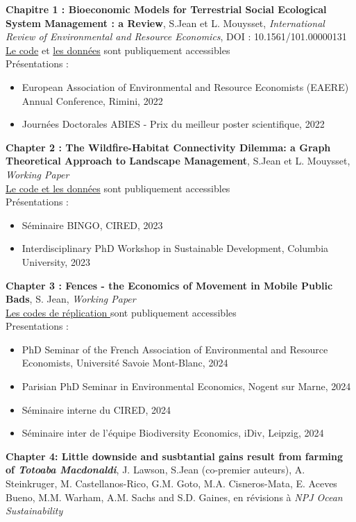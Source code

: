 \textbf{Chapitre 1 :  Bioeconomic Models for Terrestrial Social Ecological System Management : a Review}, S.Jean et L. Mouysset, \textit{International Review of Environmental and Resource Economics},
 DOI : 10.1561/101.00000131\\
\href{https://github.com/sim-jean/review-irere}{Le code} et \href{https://zenodo.org/records/6656433}{les données} sont publiquement accessibles
\\
 Présentations : 
\begin{itemize}
\item European Association of Environmental and Resource Economists (EAERE) Annual Conference, Rimini, 2022
\item Journées Doctorales ABIES - Prix du meilleur poster scientifique, 2022
\end{itemize}
%
\textbf{Chapter 2 : The Wildfire-Habitat Connectivity Dilemma: a Graph Theoretical Approach to Landscape Management}, S.Jean et L. Mouysset, \textit{Working Paper}\\
\href{https://github.com/sim-jean/Landscape_connectivity_dilemma}{Le code et les données} sont publiquement accessibles
%
\\
Présentations : 
\begin{itemize}
\item Séminaire BINGO, CIRED, 2023
\item Interdisciplinary PhD Workshop in Sustainable Development, Columbia University, 2023
\end{itemize}
%
\textbf{Chapter 3 : Fences - the Economics of Movement in Mobile Public Bads}, S. Jean, \textit{Working Paper}\\
\href{https://github.com/sim-jean/fences}{Les codes de réplication } sont publiquement accessibles
\\
Presentations : 
\begin{itemize}
\item PhD Seminar of the French Association of Environmental and Resource Economists, Université Savoie Mont-Blanc, 2024
\item Parisian PhD Seminar in Environmental Economics, Nogent sur Marne, 2024
\item Séminaire interne du CIRED, 2024
\item Séminaire inter de l'équipe Biodiversity Economics, iDiv, Leipzig, 2024
\end{itemize}
%
\textbf{Chapter 4: Little downside and susbtantial gains result from farming of \textit{Totoaba Macdonaldi}}, J. Lawson, S.Jean (co-premier auteurs), A. Steinkruger, M. Castellanos-Rico, G.M. Goto, M.A. Cisneros-Mata, E. Aceves Bueno, M.M. Warham, A.M. Sachs and S.D. Gaines,  en révisions à  \textit{NPJ Ocean Sustainability}\\
